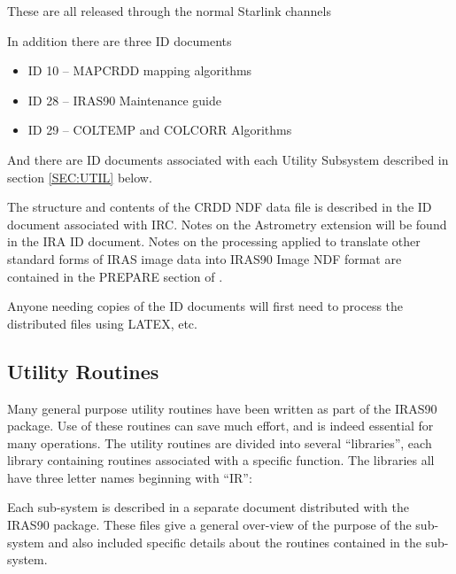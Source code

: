 \documentclass[twoside,11pt,nolof]{starlink}
\begin{document}
These are all released through the normal Starlink channels

In addition there are three ID documents

\begin{itemize}

\item ID 10 -- MAPCRDD mapping algorithms

\item ID 28 -- IRAS90 Maintenance guide

\item ID 29 -- COLTEMP and COLCORR Algorithms

\end{itemize}

And there are ID documents associated with each Utility Subsystem described in
section \ref{SEC:UTIL} below.

The structure and contents of the CRDD NDF data file is described in the ID
document associated with IRC. Notes on the Astrometry extension will be found
in the IRA ID document. Notes on the processing applied to translate other
standard forms of IRAS image data into IRAS90 Image NDF format are contained
in the PREPARE section of .

Anyone needing copies of the ID documents will first need to process the
distributed files using {\small LATEX}, etc.


\subsection{Utility Routines
\label{SEC:UTIL}}

Many general purpose utility routines have been written as part of the
{\small IRAS90} package. Use of these routines can save much effort,
and is indeed essential for many operations. The utility routines are
divided into several ``libraries'', each library containing routines
associated with a specific function. The libraries all have three
letter names beginning with ``IR'':

Each sub-system is described in a separate document distributed with
the {\small IRAS90} package. These files give a
general over-view of the purpose of the sub-system and also included
specific details about the routines contained in the sub-system.
\end{document}
